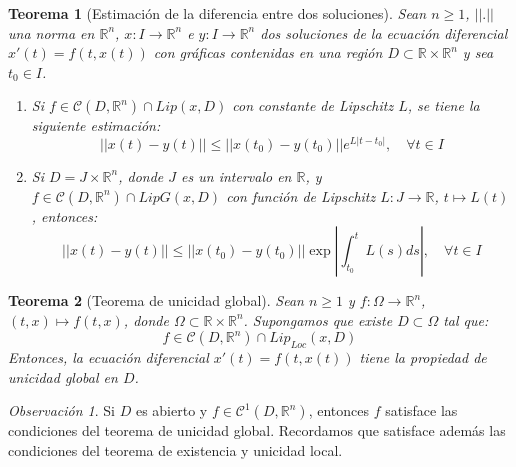 \documentclass{report}
\newtheorem{theorem}{Teorema}[chapter]
\theoremstyle{remark}
\newtheorem*{remark}{Observación}
\theoremstyle{remark}
\theoremstyle{remark}
\theoremstyle{definition}
\theoremstyle{definition}
\theoremstyle{definition}
\begin{document}
\begin{theorem}[Estimación de la diferencia entre dos soluciones]
    Sean $n \geq 1$, $||.||$ una norma en $\mathbb{R}^n$, $x: I \to \mathbb{R}^n$ e $y: I \to \mathbb{R}^n$ dos soluciones de la ecuación diferencial $x'(t) = f(t, x(t))$ con gráficas contenidas en una región $D \subset \mathbb{R} \times \mathbb{R}^n$ y sea $t_0 \in I$.
    \begin{enumerate}
        \item Si $f \in \mathcal{C}(D, \mathbb{R}^n) \cap Lip(x, D)$ con constante de Lipschitz $L$, se tiene la siguiente estimación:
              $$||x(t) - y(t)|| \leq ||x(t_0) - y(t_0)|| e^{L|t-t_0|}, \quad \forall t \in I$$
        \item Si $D = J \times \mathbb{R}^n$, donde $J$ es un intervalo en $\mathbb{R}$, y $f \in \mathcal{C}(D, \mathbb{R}^n) \cap LipG(x, D)$ con función de Lipschitz $L: J \to \mathbb{R}$, $t \mapsto L(t)$, entonces:
              $$||x(t) - y(t)|| \leq ||x(t_0) - y(t_0)|| \exp\left| \int_{t_0}^t L(s)ds \right|, \quad \forall t \in I$$
    \end{enumerate}
\end{theorem}

\begin{theorem}[Teorema de unicidad global]
    Sean $n \geq 1$ y $f: \Omega \to \mathbb{R}^n$, $(t, x) \mapsto f(t, x)$, donde $\Omega \subset \mathbb{R} \times \mathbb{R}^n$.
    Supongamos que existe $D \subset \Omega$ tal que:
    $$f \in \mathcal{C}(D, \mathbb{R}^n) \cap Lip_{Loc}(x, D)$$
    Entonces, la ecuación diferencial $x'(t) = f(t, x(t))$ tiene la propiedad de unicidad global en $D$.
\end{theorem}

\begin{remark}
    Si $D$ es abierto y $f \in \mathcal{C}^1(D, \mathbb{R}^n)$, entonces $f$ satisface las condiciones del teorema de unicidad global.
    Recordamos que satisface además las condiciones del teorema de existencia y unicidad local.
\end{remark}
\end{document}
